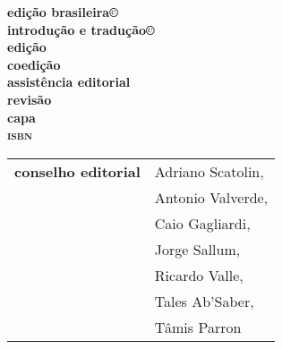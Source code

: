 \newcommand{\linha}[2]{\ifdef{#2}{\linhalayout{#1}{#2}}{}}

\begingroup\tiny
\parindent=0cm
\thispagestyle{empty}

\textbf{edição brasileira©}\\
\textbf{introdução e tradução©}\\


\textbf{edição}\\
\textbf{coedição}\\
\textbf{assistência editorial}\\
\textbf{revisão}\\
\textbf{capa}\\

\textbf{\textsc{isbn}}

\hspace{-5pt}\begin{tabular}{ll}
\textbf{conselho editorial} & Adriano Scatolin,  \\
							& Antonio Valverde,  \\
							& Caio Gagliardi,    \\
							& Jorge Sallum,      \\
							& Ricardo Valle,     \\
							& Tales Ab'Saber,    \\
							& Tâmis Parron      
\end{tabular}
 
